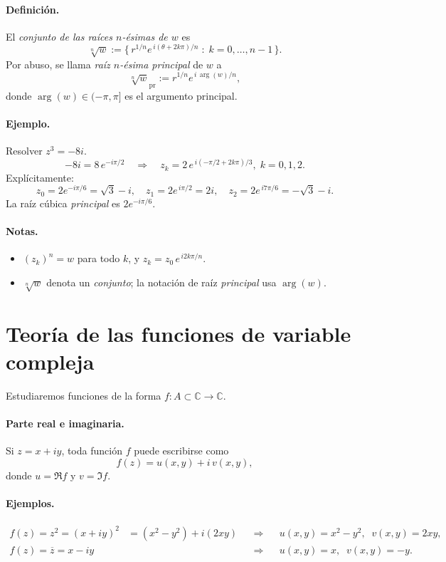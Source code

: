 \documentclass[a4paper,12pt]{article}
\begin{document}
\paragraph{Definición.}
El \emph{conjunto de las raíces \(n\)-ésimas de \(w\)} es
\[
\sqrt[n]{w}:=\bigl\{\,r^{1/n}e^{\,i(\theta+2k\pi)/n}\;:\;k=0,\dots,n-1\,\bigr\}.
\]
Por abuso, se llama \emph{raíz \(n\)-ésima principal} de \(w\) a
\[
\sqrt[n]{w}_{\mathrm{pr}}:=r^{1/n}e^{\,i\,\arg(w)/n},
\]
donde \(\arg(w)\in(-\pi,\pi]\) es el argumento principal.

\paragraph{Ejemplo.} Resolver \(z^3=-8i\).
\[
-8i=8\,e^{-i\pi/2}\quad\Rightarrow\quad
z_k=2\,e^{\,i(-\pi/2+2k\pi)/3},\;k=0,1,2.
\]
Explícitamente:
\[
z_0=2e^{-i\pi/6}=\sqrt{3}-i,\quad
z_1=2e^{\,i\pi/2}=2i,\quad
z_2=2e^{\,i7\pi/6}=-\sqrt{3}-i.
\]
La raíz cúbica \emph{principal} es \(2e^{-i\pi/6}\).

\paragraph{Notas.}
\begin{itemize}[leftmargin=1.2em]
  \item \((z_k)^n=w\) para todo \(k\), y \(z_k=z_0\,e^{\,i2k\pi/n}\).
  \item \(\sqrt[n]{w}\) denota un \emph{conjunto}; la notación de raíz \emph{principal} usa \(\arg(w)\).
\end{itemize}

\section{Teoría de las funciones de variable compleja}
Estudiaremos funciones de la forma \(f:A\subset\mathbb{C}\to\mathbb{C}\).

\paragraph{Parte real e imaginaria.}
Si \(z=x+iy\), toda función \(f\) puede escribirse como
\[
f(z)=u(x,y)+i\,v(x,y),
\]
donde \(u=\Re f\) y \(v=\Im f\).

\paragraph{Ejemplos.}
\begin{align*}
f(z)=z^2=(x+iy)^2 &= (x^2-y^2)+i(2xy)
&&\Rightarrow&& u(x,y)=x^2-y^2,\;\; v(x,y)=2xy,\\
f(z)=\overline{z}=x-iy &&&\Rightarrow&& u(x,y)=x,\;\; v(x,y)=-y.
\end{align*}
\end{document}
